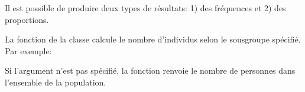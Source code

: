 \documentclass[letterpaper,10pt,french]{sphinxmanual}
\begin{document}
Il est possible de produire deux types de résultats: 1) des fréquences et 2) des proportions.


La fonction  de la classe  calcule le nombre d’individus selon le sous\sphinxhyphen{}groupe spécifié. Par exemple:

\begin{sphinxVerbatim}[commandchars=\\\{\}]
\end{sphinxVerbatim}

Si l’argument  n’est pas spécifié, la fonction renvoie le nombre de personnes dans l’ensemble de la population.

\end{document}
